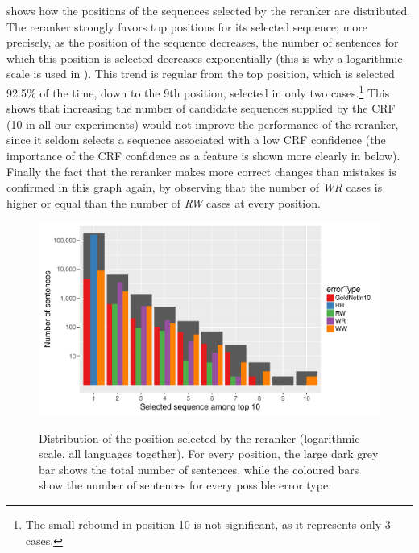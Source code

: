 \documentclass[output=paper,modfonts,nonflat]{langsci/langscibook}
\begin{document}
 shows how the positions of the
sequences selected by the reranker are distributed. The reranker
strongly favors top positions for its selected sequence; more
precisely, as the position of the sequence decreases, the number of
sentences for which this position is selected decreases exponentially
(this is why a logarithmic scale is used in
). This trend is regular from the top position,
which is selected 92.5\% of the time, down to the 9th position,
selected in only two cases.\footnote{The small rebound in position 10
  is not significant, as it represents only 3 cases.} This shows that
increasing the number of candidate sequences supplied by the CRF (10
in all our experiments) would not improve the performance of the
reranker, since it seldom selects a sequence associated with a low CRF
confidence (the importance of the CRF confidence as a feature is shown
more clearly in  below). Finally the fact
that the reranker makes more correct changes than mistakes is
confirmed in this graph again, by observing that the number of {\em
  WR} cases is higher or equal than the number of {\em RW} cases at
every position.


\begin{figure}
  \centering
      {\includegraphics[scale=0.4]{figures/graph-selected-seq-log-by-error-type.pdf}}
      {\caption{{Distribution of the position selected by the reranker
            (logarithmic scale, all languages together). } For every position, the large dark
          grey bar shows the total number of sentences, while the
          coloured bars show the number of sentences for every possible
          error type.\protect\footnotemark
        }\label{fig:selectedSeqNo}}
\end{figure}
\end{document}
